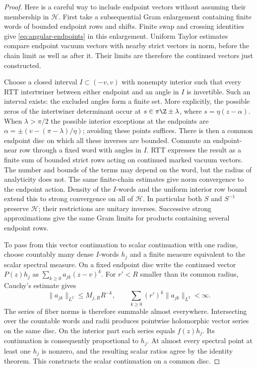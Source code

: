 \begin{proof}
Here is a careful way to include endpoint vectors without assuming their
membership in $\mathcal H$.  First take a subsequential Gram enlargement
containing finite words of bounded endpoint rows and shifts.  Finite
swap and crossing identities give \eqref{eq:angular-endpoints} in this
enlargement.  Uniform Taylor estimates compare endpoint vacuum vectors
with nearby strict vectors in norm, before the chain limit as well as
after it.  Their limits are therefore the continued vectors just
constructed.

Choose a closed interval $I\subset(-v,v)$ with nonempty interior such
that every RTT intertwiner between either endpoint and an angle in
$I$ is invertible.  Such an interval exists: the excluded angles form a
finite set.  More explicitly, the possible zeros of the intertwiner
determinant occur at $s\in\pi\Z\pm\lambda$, where
$s=\eta(z-\alpha)$.  When $\lambda>\pi/2$ the possible interior
exceptions at the endpoints are
$\alpha=\pm(v-(\pi-\lambda)/\eta)$; avoiding these points suffices.
There is then a common endpoint disc on which all these inverses are
bounded.  Commute an endpoint-near row through a fixed word with angles
in $I$.  RTT expresses the result as a finite sum of bounded strict
rows acting on continued marked vacuum vectors.  The number and bounds
of the terms may depend on the word, but the radius of analyticity
does not.  The same finite-chain estimates give norm convergence to the
endpoint action.  Density of the $I$-words and the uniform interior row
bound extend this to strong convergence on all of $\mathcal H$.
In particular both $S$ and $S^{-1}$ preserve $\mathcal H$; their
restrictions are unitary inverses.  Successive strong approximations
give the same Gram limits for products containing several endpoint rows.

To pass from this vector continuation to scalar continuation with one
radius, choose countably many dense $I$-words $h_j$ and a finite measure
equivalent to the scalar spectral measure.  On a fixed endpoint disc
write the continued vector $P(z)h_j$ as
$\sum_{k\ge0}a_{jk}(z-v)^k$.  For $r'<R$ smaller than its common
radius, Cauchy's estimate gives
\[
 \|a_{jk}\|_{L^2}\le M_{j,R}R^{-k},\qquad
 \sum_{k\ge0}(r')^k\|a_{jk}\|_{L^2}<\infty.
\]
The series of fiber norms is therefore summable almost everywhere.
Intersecting over the countable words and radii produces pointwise
holomorphic vector series on the same disc.  On the interior part each
series equals $f(z)h_j$.  Its continuation is consequently proportional
to $h_j$.  At almost every spectral point at least one $h_j$ is nonzero,
and the resulting scalar ratios agree by the identity theorem.  This
constructs the scalar continuation on a common disc.


\end{proof}
